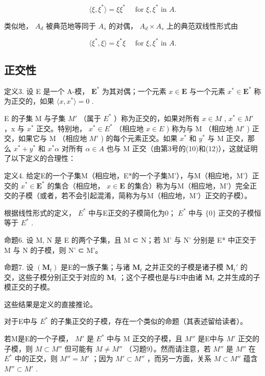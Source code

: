 \[
\langle \xi , \xi^ {*} \rangle = \xi \xi^ {*} \quad \text { for } \xi , \xi^ {*} \text { in } A.\tag{13}
\]

类似地， \(A_{d}\) 被典范地等同于 \(A_{s}\) 的对偶， \(A_{d} \times A_{s}\) 上的典范双线性形式由

\[
\langle \xi^ {*}, \xi \rangle = \xi^ {*} \xi \quad \text { for } \xi , \xi^ {*} \text { in } A.\tag{14}
\]

\subsection{正交性}

定义3. 设 E 是一个 A-模， \(\mathbf{E}^*\) 为其对偶；一个元素 \(x \in \mathbf{E}\) 与一个元素 \(x^* \in \mathbf{E}^*\) 称为正交的，如果 \(\langle x, x^* \rangle = 0\) .

E 的子集 M 与子集 \(M'\) （属于 \(E^{*}\) ）称为正交的，如果对所有 \(x \in M\) , \(x^{*} \in M'\) ，x 与 \(x^{*}\) 正交。特别地， \(x^{*} \in E^{*}\) （相应地 \(x \in E\) ) 称为与 M （相应地 \(M'\) ) 正交，如果它与 M （相应地 \(M'\) ) 的每个元素正交。如果 \(x^{*}\) 和 \(y^{*}\) 与 M 正交，那么 \(x^{*} + y^{*}\) 和 \(x^{*}\alpha\) 对所有 \(\alpha \in A\) 也与 M 正交（由第3号的(10)和(12)），这就证明了以下定义的合理性：

定义4. 给定E的一个子集M（相应地，E*的一个子集M'），与M（相应地，M'）正交的 \(x^* \in \mathbf{E}^*\) 的集合（相应地， \(x \in \mathbf{E}\) 的集合）称为与M（相应地，M'）完全正交的子模（或者，若不会引起混淆，简称为与M（相应地，M'）正交的子模）。

根据线性形式的定义， \(E^{*}\) 中与E正交的子模简化为0； \(E^{*}\) 中与 \(\{0\}\) 正交的子模恒等于 \(E^{*}\) .

命题6. 设 M, N 是 E 的两个子集，且 M ⊂ N；若 M' 与 N' 分别是 E* 中正交于 M 与 N 的子模，则 N' ⊂ M'。

命题7. 设 \((\mathbf{M}_t)\) 是E的一族子集；与诸 \(\mathbf{M}_t\) 之并正交的子模是诸子模 \(\mathbf{M}_t'\) 的交，这些子模分别正交于对应的 \(\mathbf{M}_t\) ；这个子模也是与E中由诸 \(\mathbf{M}_t\) 之并生成的子模正交的子模。

这些结果是定义的直接推论。

对于E中与 \(E^{*}\) 的子集正交的子模，存在一个类似的命题（其表述留给读者）。

若M是E的一个子模， \(M'\) 是 \(E^{*}\) 中与 M 正交的子模，且 \(M''\) 是E中与 \(M'\) 正交的子模，则 \(M \subset M''\) 但可能有 \(M \neq M''\) （习题9）。然而请注意，若 \(M''\) 是 \(M''\) 在 \(E^{*}\) 中的正交，则 \(M'' = M'\) ；因为 \(M' \subset M''\) ，而另一方面，关系 \(M \subset M''\) 蕴含 \(M'' \subset M'\) .

